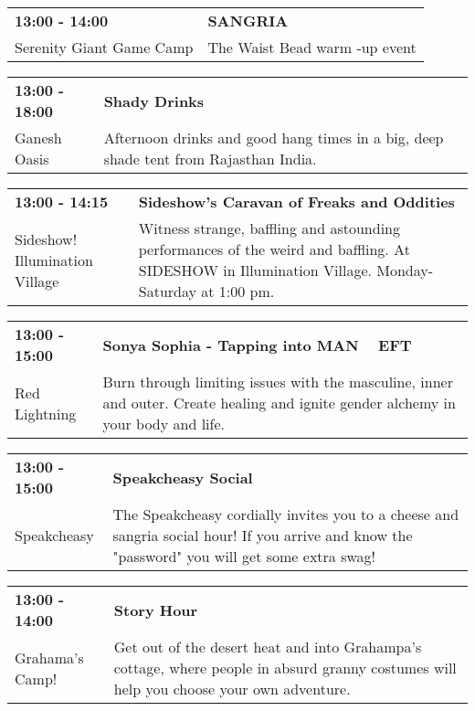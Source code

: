\begin{tabular}{ p{1in} p{2.2in} }
    \textbf{13:00 - 14:00} & \textbf{SANGRIA} \\
    Serenity Giant Game Camp \newline  & The Waist Bead warm -up event \\
    \hline 
\end{tabular}
    
\begin{tabular}{ p{1in} p{2.2in} }
    \textbf{13:00 - 18:00} & \textbf{Shady Drinks} \\
    Ganesh Oasis \newline  & Afternoon drinks and good hang times in a big, deep shade tent from Rajasthan India. \\
    \hline 
\end{tabular}
    
\begin{tabular}{ p{1in} p{2.2in} }
    \textbf{13:00 - 14:15} & \textbf{Sideshow's Caravan of Freaks and Oddities} \\
    Sideshow! \newline Illumination Village & Witness strange, baffling and astounding performances of the weird and baffling. At SIDESHOW in Illumination Village. Monday-Saturday at 1:00 pm. \\
    \hline 
\end{tabular}
    
\begin{tabular}{ p{1in} p{2.2in} }
    \textbf{13:00 - 15:00} & \textbf{Sonya Sophia - Tapping into MAN ~ EFT} \\
    Red Lightning \newline  & Burn through limiting issues with the masculine, inner and outer. Create healing and ignite gender alchemy in your body and life. \\
    \hline 
\end{tabular}
    
\begin{tabular}{ p{1in} p{2.2in} }
    \textbf{13:00 - 15:00} & \textbf{Speakcheasy Social} \\
    Speakcheasy \newline  & The Speakcheasy cordially invites you to a cheese and sangria social hour! If you arrive and know the "password" you will get some extra swag! \\
    \hline 
\end{tabular}
    
\begin{tabular}{ p{1in} p{2.2in} }
    \textbf{13:00 - 14:00} & \textbf{Story Hour} \\
    Grahama's Camp! \newline  & Get out of the desert heat and into Grahampa's cottage, where people in absurd granny costumes will help you choose your own adventure. \\
    \hline 
\end{tabular}
    
